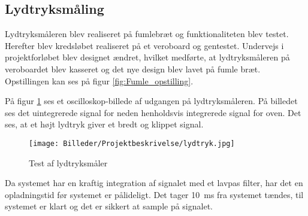 \subsection{Lydtryksmåling}
Lydtryksmåleren blev realiseret på fumlebræt og funktionaliteten blev testet. Herefter blev kredsløbet realiseret på et veroboard og gentestet. Undervejs i projektforløbet blev designet ændret, hvilket medførte, at lydtryksmåleren på veroboardet blev kasseret og det nye design blev lavet på fumle bræt. Opstillingen kan ses på figur \ref{fig:Fumle_opstilling}.


På figur \ref{fig:lydtryk} ses et oscilloskop-billede af udgangen på lydtryksmåleren. På billedet ses det uintegrerede signal for neden henholdsvis integrerede signal for oven. Det ses, at et højt lydtryk giver et bredt og klippet signal.

\begin{figure}[H]
  \centering
    \texttt{[image: Billeder/Projektbeskrivelse/lydtryk.jpg]}
    \caption{Test af lydtryksmåler}
    \label{fig:lydtryk}
\end{figure}

Da systemet har en kraftig integration af signalet med et lavpas filter, har det en opladningstid før systemet er pålideligt. 
Det tager \SI{10}{ms} fra systemet tændes, til systemet er klart og det er sikkert at sample på signalet.